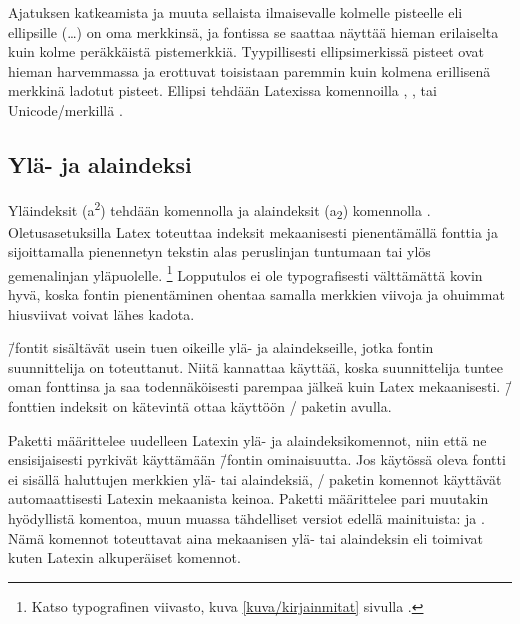 Ajatuksen katkeamista ja muuta sellaista ilmaisevalle kolmelle pisteelle
eli ellipsille (\ldots) on oma merkkinsä, ja fontissa se saattaa näyttää
hieman erilaiselta kuin kolme peräkkäistä pistemerkkiä. Tyypillisesti
ellipsimerkissä pisteet ovat hieman harvemmassa ja erottuvat toisistaan
paremmin kuin kolmena erillisenä merkkinä ladotut pisteet. Ellipsi
tehdään Latexissa komennoilla , ,
 tai Unicode\-/merkillä .

\subsection{Ylä- ja alaindeksi}
\label{luku/ylä-alaindeksit}

Yläindeksit (a\textsuperscript{2}) tehdään komennolla
 ja alaindeksit (a\textsubscript{2})
komennolla . Oletusasetuksilla Latex toteuttaa
indeksit mekaanisesti pienentämällä fonttia ja sijoittamalla pienennetyn
tekstin alas peruslinjan tuntumaan tai ylös gemenalinjan yläpuolelle.%
\footnote{Katso typografinen viivasto, kuva \ref{kuva/kirjainmitat}
  sivulla \pageref{kuva/kirjainmitat}.} Lopputulos ei ole typografisesti
välttämättä kovin hyvä, koska fontin pienentäminen ohentaa samalla
merkkien viivoja ja ohuimmat hiusviivat voivat lähes kadota.

 \=/fontit sisältävät usein tuen oikeille ylä- ja
alaindekseille, jotka fontin suunnittelija on toteuttanut. Niitä
kannattaa käyttää, koska suunnittelija tuntee oman fonttinsa ja saa
todennäköisesti parempaa jälkeä kuin Latex mekaanisesti.  \=/fonttien indeksit on kätevintä ottaa käyttöön
\-/ paketin avulla.

Paketti  määrittelee uudelleen Latexin ylä- ja
alaindeksikomennot, niin että ne ensisijaisesti pyrkivät käyttämään
 \=/fontin ominaisuutta. Jos käytössä oleva fontti
ei sisällä haluttujen merkkien ylä- tai alaindeksiä,
\-/ paketin komennot käyttävät automaattisesti
Latexin mekaanista keinoa. Paketti määrittelee pari muutakin hyödyllistä
komentoa, muun muassa tähdelliset versiot edellä mainituista:
 ja . Nämä komennot
toteuttavat aina mekaanisen ylä- tai alaindeksin eli toimivat kuten
Latexin alkuperäiset komennot.


